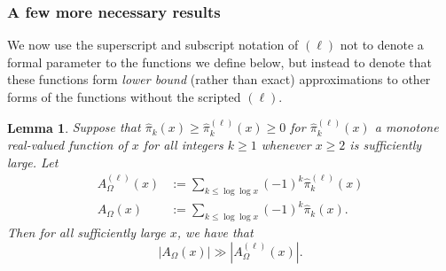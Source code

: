 \documentclass[11pt,reqno,a4letter]{article}
\numberwithin{figure}{section}
\numberwithin{table}{section}
\theoremstyle{plain}
\newtheorem{lemma}[theorem]{Lemma}
\numberwithin{theorem}{section}
\theoremstyle{definition}
\begin{document}
\subsubsection{A few more necessary results} 
\label{subsubSection_RoutineProofsNeededForMainBoundOnGInvxFunc} 

We now use the superscript and subscript notation of 
$(\ell)$ not to denote a formal parameter to 
the functions we define below, but instead to denote that these functions form 
\emph{lower bound} (rather than exact) 
approximations to other forms of the functions without the scripted $(\ell)$. 

\begin{lemma} 
\label{lemma_lowerBoundsOnLambdaFuncParitySummFuncs} 
Suppose that $\widehat{\pi}_k(x) \geq \widehat{\pi}_k^{(\ell)}(x) \geq 0$ 
for $\widehat{\pi}_k^{(\ell)}(x)$ a monotone real-valued function of $x$ 
for all integers $k \geq 1$ whenever $x \geq 2$ is sufficiently large. 
Let 
\begin{align*} 
A_{\Omega}^{(\ell)}(x) & := \sum_{k \leq \log\log x} (-1)^k \widehat{\pi}_k^{(\ell)}(x) \\ 
A_{\Omega}(x) & := \sum_{k \leq \log\log x} (-1)^k \widehat{\pi}_k(x). 
\end{align*} 
Then for all sufficiently large $x$, we have that 
$$|A_{\Omega}(x)| \gg |A_{\Omega}^{(\ell)}(x)|.$$ 
\end{lemma} 
\end{document}
